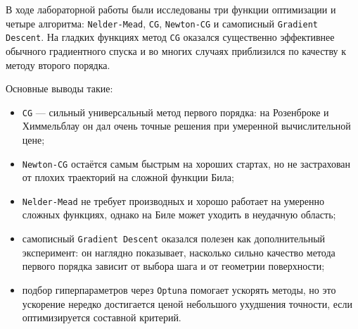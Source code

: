 \documentclass[12pt]{article}
\begin{document}
\begin{large}
\par В ходе лабораторной работы были исследованы три функции оптимизации и четыре алгоритма: \texttt{Nelder-Mead}, \texttt{CG}, \texttt{Newton-CG} и самописный \texttt{Gradient Descent}.
На гладких функциях метод \texttt{CG} оказался существенно эффективнее обычного градиентного спуска и во многих случаях приблизился по качеству к методу второго порядка.

\par Основные выводы такие:
\begin{itemize}
    \item \texttt{CG} --- сильный универсальный метод первого порядка: на Розенброке и Химмельблау он дал очень точные решения при умеренной вычислительной цене;
    \item \texttt{Newton-CG} остаётся самым быстрым на хороших стартах, но не застрахован от плохих траекторий на сложной функции Била;
    \item \texttt{Nelder-Mead} не требует производных и хорошо работает на умеренно сложных функциях, однако на Биле может уходить в неудачную область;
    \item самописный \texttt{Gradient Descent} оказался полезен как дополнительный эксперимент: он наглядно показывает, насколько сильно качество метода первого порядка зависит от выбора шага и от геометрии поверхности;
    \item подбор гиперпараметров через \texttt{Optuna} помогает ускорять методы, но это ускорение нередко достигается ценой небольшого ухудшения точности, если оптимизируется составной критерий.
\end{itemize}


%

\end{large}
\end{document}
